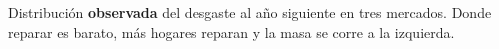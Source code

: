\documentclass[border=0pt]{standalone}
\begin{document}
\begin{minipage}{26.783cm}\fontsize{20}{24.8}\selectfont\raggedright 
Distribución \textbf{observada} del desgaste al año siguiente en tres mercados.
Donde reparar es barato, más hogares reparan y la masa se corre a la izquierda.
\end{minipage}
\end{document}
